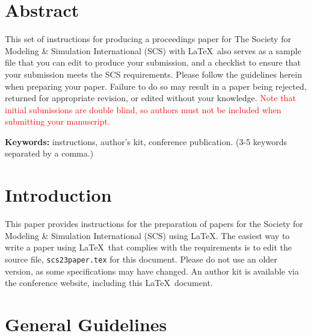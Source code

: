 \documentclass{scspaperproc}
\theoremstyle{scsthe}
\begin{document}
    \maketitle

    \section*{Abstract}

    This set of instructions for producing a proceedings paper for The Society for Modeling \& Simulation International (SCS) with \LaTeX\ also serves as a sample file that you can edit to produce your submission, and a checklist to ensure that your submission meets the SCS requirements. Please follow the guidelines herein when preparing your paper. Failure to do so may result in a paper being rejected, returned for appropriate revision, or edited without your knowledge. \textcolor{red}{Note that initial submissions are double blind, so authors must not be included when submitting your manuscript.}

    \textbf{Keywords:} instructions, author’s kit, conference publication. (3-5 keywords separated by a comma.)

    \section{Introduction}
    \label{sec:intro}

    This paper provides instructions for the preparation of papers for the Society for Modeling \& Simulation International (SCS) using \LaTeX.
    The easiest way to write a paper using \LaTeX\ that complies with the requirements is to edit the source file, \texttt{scs23paper.tex} for this document. Please do not use an older version, as some specifications may have changed. An author kit is available via the conference website, including this \LaTeX\ document.

    \section{General Guidelines}
\end{document}
